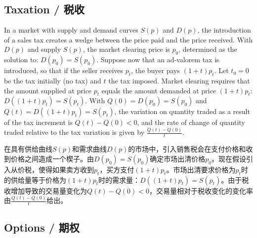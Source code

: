 \subsection{Taxation / 税收}

\begin{original}
In a market with supply and demand curves $S(p)$ and $D(p)$, the introduction of a sales tax creates a wedge between the price paid and the price received. With $D(p)$ and supply $S(p)$, the market clearing price is $p_0$, determined as the solution to: $D(p_0) = S(p_0)$. Suppose now that an ad-valorem tax is introduced, so that if the seller receives $p_t$, the buyer pays $(1 + t)p_t$. Let $t_0 = 0$ be the tax initially (no tax) and $t$ the tax imposed. Market clearing requires that the amount supplied at price $p_t$ equals the amount demanded at price $(1+t)p_t$: $D((1+t)p_t) = S(p_t)$. With $Q(0) = D(p_0) = S(p_0)$ and $Q(t) = D((1 + t)p_t) = S(p_t)$, the variation on quantity traded as a result of the tax increment is $Q(t) - Q(0) < 0$, and the rate of change of quantity traded relative to the tax variation is given by $\frac{Q(t)-Q(0)}{t}$.
\end{original}
\begin{translation}
在具有供给曲线$S(p)$和需求曲线$D(p)$的市场中，引入销售税会在支付价格和收到价格之间造成一个楔子。由$D(p_0) = S(p_0)$确定市场出清价格$p_0$。现在假设引入从价税，使得如果卖方收到$p_t$，买方支付$(1 + t)p_t$。市场出清要求价格为$p_t$时的供给量等于价格为$(1+t)p_t$时的需求量：$D((1+t)p_t) = S(p_t)$。由于税收增加导致的交易量变化为$Q(t) - Q(0) < 0$，交易量相对于税收变化的变化率由$\frac{Q(t)-Q(0)}{t}$给出。
\end{translation}

\subsection{Options / 期权}

